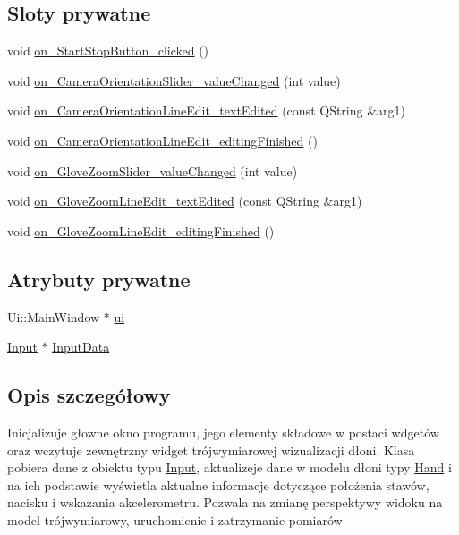 \subsection*{Sloty prywatne}
\begin{DoxyCompactItemize}
\item 
void \hyperlink{class_main_window_a0975a297069f8f0cbbd8e7acfc7d85ba}{on\+\_\+\+Start\+Stop\+Button\+\_\+clicked} ()
\item 
void \hyperlink{class_main_window_a08d7ab803fa7f4432ab79dd562547018}{on\+\_\+\+Camera\+Orientation\+Slider\+\_\+value\+Changed} (int value)
\item 
void \hyperlink{class_main_window_aab13b3768743e30605d2f7be38011d6b}{on\+\_\+\+Camera\+Orientation\+Line\+Edit\+\_\+text\+Edited} (const Q\+String \&arg1)
\item 
void \hyperlink{class_main_window_aeaf68d64561b179222fffc59bbd36e1e}{on\+\_\+\+Camera\+Orientation\+Line\+Edit\+\_\+editing\+Finished} ()
\item 
void \hyperlink{class_main_window_a1d8082f8507bb23824db76cca6a047a3}{on\+\_\+\+Glove\+Zoom\+Slider\+\_\+value\+Changed} (int value)
\item 
void \hyperlink{class_main_window_a03fd5ea60139a3735a590af735e9d35f}{on\+\_\+\+Glove\+Zoom\+Line\+Edit\+\_\+text\+Edited} (const Q\+String \&arg1)
\item 
void \hyperlink{class_main_window_a128cb9982a50c3802c80acf388cf5916}{on\+\_\+\+Glove\+Zoom\+Line\+Edit\+\_\+editing\+Finished} ()
\end{DoxyCompactItemize}
\subsection*{Atrybuty prywatne}
\begin{DoxyCompactItemize}
\item 
Ui\+::\+Main\+Window $\ast$ \hyperlink{class_main_window_a35466a70ed47252a0191168126a352a5}{ui}
\item 
\hyperlink{class_input}{Input} $\ast$ \hyperlink{class_main_window_aa4484150b90e4d13bb42316d12c34650}{Input\+Data}
\end{DoxyCompactItemize}


\subsection{Opis szczegółowy}
Inicjalizuje głowne okno programu, jego elementy składowe w postaci wdgetów oraz wczytuje zewnętrzny widget trójwymiarowej wizualizacji dłoni. Klasa pobiera dane z obiektu typu \hyperlink{class_input}{Input}, aktualizeje dane w modelu dłoni typy \hyperlink{class_hand}{Hand} i na ich podstawie wyświetla aktualne informacje dotyczące położenia stawów, nacisku i wskazania akcelerometru. Pozwala na zmianę perspektywy widoku na model trójwymiarowy, uruchomienie i zatrzymanie pomiarów 

